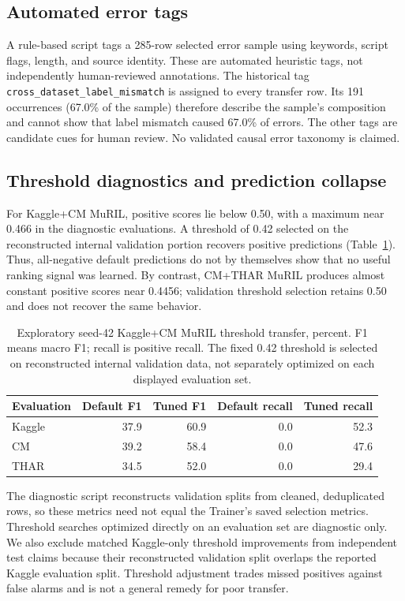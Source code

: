 \documentclass[11pt,a4paper]{article}
\begin{document}
\subsection{Automated error tags}
A rule-based script tags a 285-row selected error sample using keywords,
script flags, length, and source identity. These are automated heuristic
tags, not independently human-reviewed annotations. The historical tag
\texttt{cross\_dataset\_label\_mismatch} is assigned to every transfer
row. Its 191 occurrences (67.0\% of the sample) therefore describe the
sample's composition and cannot show that label mismatch caused 67.0\%
of errors. The other tags are candidate cues for human review. No
validated causal error taxonomy is claimed.

\subsection{Threshold diagnostics and prediction collapse}
For Kaggle+CM MuRIL, positive scores lie below 0.50, with a maximum
near 0.466 in the diagnostic evaluations. A threshold of 0.42 selected
on the reconstructed internal validation portion recovers positive
predictions (Table~\ref{tab:threshold}). Thus, all-negative default
predictions do not by themselves show that no useful ranking signal
was learned. By contrast, CM+THAR MuRIL produces almost constant positive
scores near 0.4456; validation threshold selection retains 0.50 and
does not recover the same behavior.

\begin{table}[htbp]
\centering\small
\begin{tabular}{lrrrr}
\toprule
Evaluation & Default F1 & Tuned F1 & Default recall & Tuned recall\\
\midrule
Kaggle & 37.9 & 60.9 & 0.0 & 52.3\\
CM     & 39.2 & 58.4 & 0.0 & 47.6\\
THAR   & 34.5 & 52.0 & 0.0 & 29.4\\
\bottomrule
\end{tabular}
\caption{Exploratory seed-42 Kaggle+CM MuRIL threshold transfer,
percent. F1 means macro F1; recall is positive recall. The fixed 0.42
threshold is selected on reconstructed internal validation data, not
separately optimized on each displayed evaluation set.}
\label{tab:threshold}
\end{table}

The diagnostic script reconstructs validation splits from cleaned,
deduplicated rows, so these metrics need not equal the Trainer's saved
selection metrics. Threshold searches optimized directly on an evaluation
set are diagnostic only. We also exclude matched Kaggle-only threshold
improvements from independent test claims because their reconstructed
validation split overlaps the reported Kaggle evaluation split. Threshold
adjustment trades missed positives against false alarms and is not a
general remedy for poor transfer.
\end{document}
